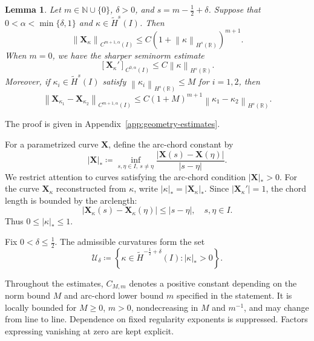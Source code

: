 \documentclass[11pt,reqno]{amsart}
\theoremstyle{plain}
\newtheorem{lemma}[theorem]{Lemma}
\theoremstyle{definition}
\numberwithin{equation}{section}
\newcommand{\paren}[1]{\left(#1\right)}
\newcommand{\mc}[1]{\mathcal{#1}}
\newcommand{\wt}[1]{\widetilde{#1}}
\newcommand{\bm}[1]{\boldsymbol{#1}}
\newcommand{\abs}[1]{\left\lvert #1 \right\rvert}
\newcommand{\norm}[1]{\left\lVert #1 \right\rVert}
\newcommand{\R}{\mathbb{R}}
\newcommand{\xk}{\bm X_\kappa}
\newcommand{\xka}[1]{\bm X_{\kappa_{#1}}}
\newcommand{\ci}[1]{C^{#1}(I)}
\newcommand{\thi}[1]{\wt H^{#1}(I)}
\newcommand{\hr}[1]{H^{#1}(\R)}
\begin{document}
\begin{lemma}\label{lem:Xk-holder}
Let $m\in \mathbb N\cup\{0\}$, $\delta>0$, and
$s=m-\frac{1}{2}+\delta$. Suppose that
$0<\alpha<\min\{\delta,1\}$ and $\kappa\in \thi{s}$. Then
\begin{equation}\label{eqn:Xk-holder-higher}
    \norm{\xk}_{\ci{m+1,\alpha}} \le C\paren{1+\norm{\kappa}_{\hr{s}}}^{m+1}.
\end{equation}
When $m=0$, we have the sharper seminorm estimate
\begin{equation}\label{eqn:Xk-holder}
    [\xk']_{\ci{0,\alpha}} \le C \norm{\kappa}_{\hr{s}}.
\end{equation}
Moreover, if $\kappa_i\in \thi{s}$ satisfy
$\norm{\kappa_i}_{\hr{s}}\le M$ for $i=1,2$, then
\begin{equation}\label{eqn:Xk-holder-higher-lip}
    \norm{\xka{1}-\xka{2}}_{\ci{m+1,\alpha}}
    \le C\paren{1+M}^{m+1}\norm{\kappa_1-\kappa_2}_{\hr{s}}.
\end{equation}
\end{lemma}

The proof is given in Appendix~\ref{app:geometry-estimates}.

For a parametrized curve $\bm X$, define the arc-chord constant by
\begin{equation}\label{eqn:arc-chord-intro}
    \abs{\bm X}_*
    \coloneqq
    \inf_{s,\eta\in I,\ s\neq\eta}
    \frac{\abs{\bm X(s)-\bm X(\eta)}}{\abs{s-\eta}}.
\end{equation}
We restrict attention to curves satisfying the arc-chord condition
$\abs{\bm X}_*>0$. For the curve $\xk$ reconstructed from $\kappa$, write
$\abs{\kappa}_*=\abs{\xk}_*$. Since $\abs{\xk'}=1$, the chord length
is bounded by the arclength:
\begin{equation}
    \abs{\xk(s)-\xk(\eta)}\le\abs{s-\eta},
    \quad s,\eta\in I.
\end{equation}
Thus $0\le\abs{\kappa}_*\le1$.

Fix $0<\delta\le\frac12$. The admissible curvatures form the set
\begin{equation}\label{eqn:U-intro}
    \mc U_\delta
    \coloneqq
    \left\{
    \kappa\in\thi{-\frac12+\delta}:\abs{\kappa}_*>0
    \right\}.
\end{equation}

Throughout the estimates, $C_{M,m}$ denotes a positive constant depending
on the norm bound $M$ and arc-chord lower bound $m$ specified in the
statement. It is locally bounded for $M\ge0$, $m>0$, nondecreasing in $M$
and $m^{-1}$, and may change from line to line. Dependence on fixed
regularity exponents is suppressed. Factors expressing vanishing at zero
are kept explicit.
\end{document}
